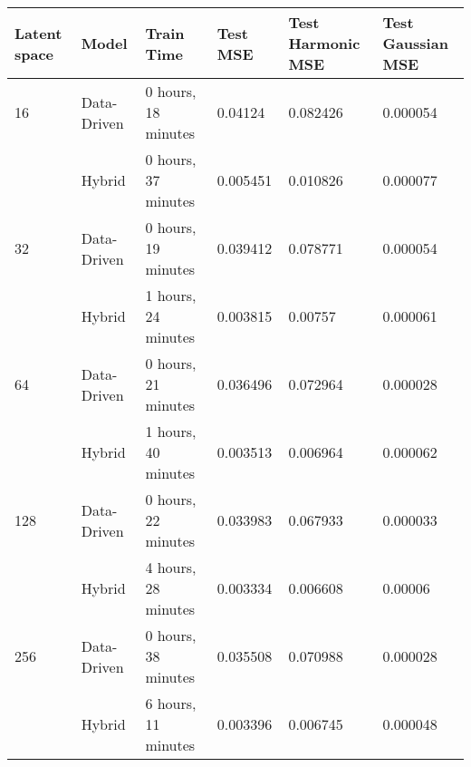 \begin{tabular}{llllll}
\toprule
   Latent space & Model &           Train Time &  Test MSE & Test Harmonic MSE & Test Gaussian MSE \\
\midrule
16  & Data-Driven &  0 hours, 18 minutes &   0.04124 &          0.082426 &          0.000054 \\
    & Hybrid &  0 hours, 37 minutes &  0.005451 &          0.010826 &          0.000077 \\
32  & Data-Driven &  0 hours, 19 minutes &  0.039412 &          0.078771 &          0.000054 \\
    & Hybrid &  1 hours, 24 minutes &  0.003815 &           0.00757 &          0.000061 \\
64  & Data-Driven &  0 hours, 21 minutes &  0.036496 &          0.072964 &          0.000028 \\
    & Hybrid &  1 hours, 40 minutes &  0.003513 &          0.006964 &          0.000062 \\
128 & Data-Driven &  0 hours, 22 minutes &  0.033983 &          0.067933 &          0.000033 \\
    & Hybrid &  4 hours, 28 minutes &  0.003334 &          0.006608 &           0.00006 \\
256 & Data-Driven &  0 hours, 38 minutes &  0.035508 &          0.070988 &          0.000028 \\
    & Hybrid &  6 hours, 11 minutes &  0.003396 &          0.006745 &          0.000048 \\
\bottomrule
\end{tabular}
